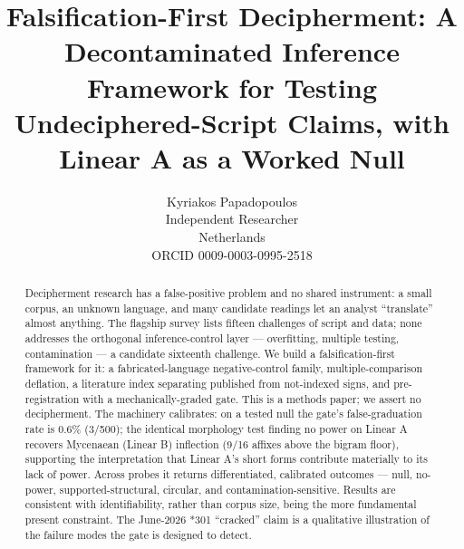 
\ifanon
  \newcommand{\artref}{the artifact}
  \newcommand{\artobj}{the artifact}
\else
  \newcommand{\artref}{logos v0.1.0}
  \newcommand{\artobj}{the logos artifact (v0.1.0)}
\fi

\ifanon
\else
\fi

\title{Falsification-First Decipherment: A Decontaminated Inference
Framework for Testing Undeciphered-Script Claims, with Linear A as a
Worked Null}

\ifanon
  \author{}
\else
  \author{
    Kyriakos Papadopoulos \\
    Independent Researcher \\
    Netherlands \\
    ORCID 0009-0003-0995-2518
  }
\fi

\date{}


\maketitle

\begin{abstract}
Decipherment research has a false-positive problem and no shared
instrument: a small corpus, an unknown language, and many candidate
readings let an analyst ``translate'' almost anything. The flagship
survey lists fifteen challenges of script and data; none addresses the
orthogonal inference-control layer --- overfitting, multiple testing,
contamination --- a candidate sixteenth challenge. We build a
falsification-first framework for it: a fabricated-language
negative-control family, multiple-comparison deflation, a literature
index separating published from not-indexed signs, and pre-registration
with a mechanically-graded gate. This is a methods paper; we assert no
decipherment. The machinery calibrates: on a tested null the gate's
false-graduation rate is 0.6\% (3/500); the identical morphology test
finding no power on Linear A recovers Mycenaean (Linear B) inflection
(9/16 affixes above the bigram floor), supporting the interpretation
that Linear A's short forms contribute materially to its lack of power.
Across probes it returns differentiated, calibrated outcomes --- null,
no-power, supported-structural, circular, and contamination-sensitive.
Results are consistent with identifiability, rather than corpus size,
being the more fundamental present constraint. The June-2026 *301
``cracked'' claim is a qualitative illustration of the failure modes the
gate is designed to detect.
\end{abstract}

